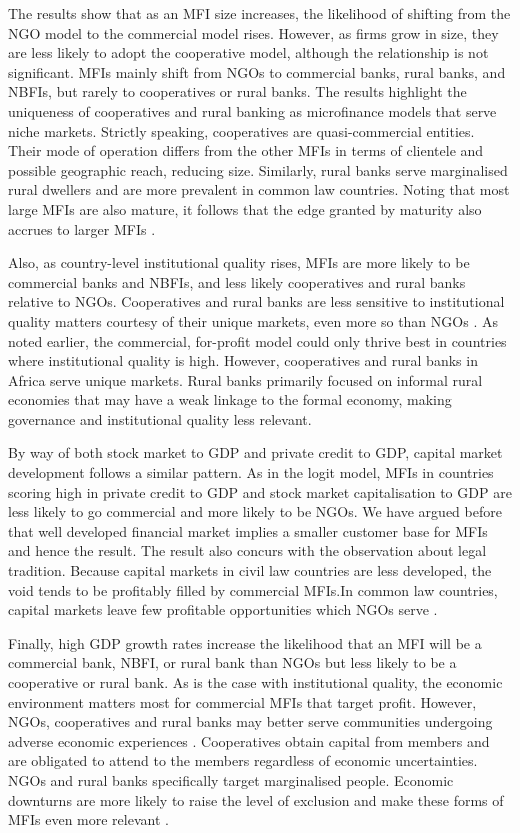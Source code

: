 \documentclass[a4paper, nobind]{templates/ociamthesis}
\begin{document}
The results show that as an MFI size increases, the likelihood of shifting from the NGO model to the commercial model rises. However, as firms grow in size, they are less likely to adopt the cooperative model, although the relationship is not significant. MFIs mainly shift from NGOs to commercial banks, rural banks, and NBFIs, but rarely to cooperatives or rural banks. The results highlight the uniqueness of cooperatives and rural banking as microfinance models that serve niche markets. Strictly speaking, cooperatives are quasi-commercial entities. Their mode of operation differs from the other MFIs in terms of clientele and possible geographic reach, reducing size. Similarly, rural banks serve marginalised rural dwellers and are more prevalent in common law countries. Noting that most large MFIs are also mature, it follows that the edge granted by maturity also accrues to larger MFIs \autocite{beck2014sme,kersten2017small}.

Also, as country-level institutional quality rises, MFIs are more likely to be commercial banks and NBFIs, and less likely cooperatives and rural banks relative to NGOs. Cooperatives and rural banks are less sensitive to institutional quality matters courtesy of their unique markets, even more so than NGOs \autocite{sobel2008testing}. As noted earlier, the commercial, for-profit model could only thrive best in countries where institutional quality is high. However, cooperatives and rural banks in Africa serve unique markets. Rural banks primarily focused on informal rural economies that may have a weak linkage to the formal economy, making governance and institutional quality less relevant.

By way of both stock market to GDP and private credit to GDP, capital market development follows a similar pattern. As in the logit model, MFIs in countries scoring high in private credit to GDP and stock market capitalisation to GDP are less likely to go commercial and more likely to be NGOs. We have argued before that well developed financial market implies a smaller customer base for MFIs and hence the result. The result also concurs with the observation about legal tradition. Because capital markets in civil law countries are less developed, the void tends to be profitably filled by commercial MFIs.In common law countries, capital markets leave few profitable opportunities which NGOs serve \autocite{d2013unsubsidized,armendariz2013subsidy}.

Finally, high GDP growth rates increase the likelihood that an MFI will be a commercial bank, NBFI, or rural bank than NGOs but less likely to be a cooperative or rural bank. As is the case with institutional quality, the economic environment matters most for commercial MFIs that target profit. However, NGOs, cooperatives and rural banks may better serve communities undergoing adverse economic experiences \autocite{ghosh2013microfinance}. Cooperatives obtain capital from members and are obligated to attend to the members regardless of economic uncertainties. NGOs and rural banks specifically target marginalised people. Economic downturns are more likely to raise the level of exclusion and make these forms of MFIs even more relevant \autocite{schnyder2018twenty}.
\end{document}
